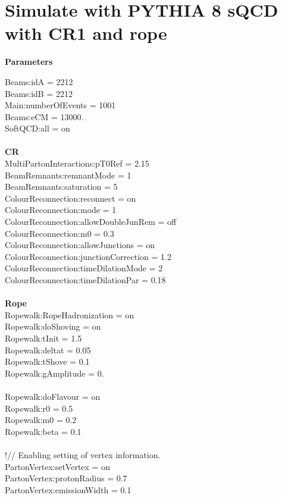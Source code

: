
\section{Simulate with PYTHIA 8 sQCD with CR1 and rope}%
\label{sec:Parameter}


\textbf{Parameters}

Beams:idA = 2212
\\Beams:idB = 2212
\\Main:numberOfEvents = 1001
\\Beams:eCM = 13000.
\\SoftQCD:all = on
\\
\\\textbf{CR}
\\MultiPartonInteractions:pT0Ref = 2.15
\\BeamRemnants:remnantMode = 1
\\BeamRemnants:saturation = 5
\\ColourReconnection:reconnect = on
\\ColourReconnection:mode = 1
\\ColourReconnection:allowDoubleJunRem = off
\\ColourReconnection:m0 = 0.3
\\ColourReconnection:allowJunctions = on
\\ColourReconnection:junctionCorrection = 1.2
\\ColourReconnection:timeDilationMode = 2
\\ColourReconnection:timeDilationPar = 0.18
\\
\\\textbf{Rope}
\\Ropewalk:RopeHadronization = on
\\Ropewalk:doShoving = on
\\Ropewalk:tInit = 1.5 %
\\Ropewalk:deltat = 0.05
\\Ropewalk:tShove = 0.1
\\Ropewalk:gAmplitude = 0. %
\\
\\Ropewalk:doFlavour = on
\\Ropewalk:r0 = 0.5
\\Ropewalk:m0 = 0.2
\\Ropewalk:beta = 0.1
\\
\\!// Enabling setting of vertex information.
\\PartonVertex:setVertex = on
\\PartonVertex:protonRadius = 0.7
\\PartonVertex:emissionWidth = 0.1


